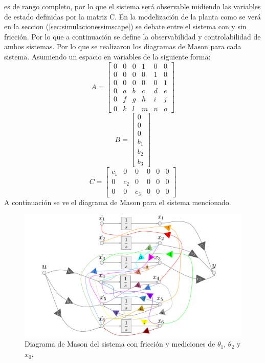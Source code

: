 es de rango completo, por lo que el sistema será observable midiendo las variables de estado definidas por la matriz C.
En la modelización de la planta como se verá en la seccion (\ref{sec:simulacionessimscape}) se debate entre el sistema con y sin fricción.
Por lo que a continuación se define la observabilidad y controlabilidad de ambos sistemas. Por lo que se realizaron los diagramas de Mason para cada sistema.
Asumiendo un espacio en variables de la siguiente forma:
\begin{equation}
 A = \begin{bmatrix}
0 &  0 & 0 & 1 &  0 & 0\\
0 &  0 & 0 & 0 &  1 & 0\\
0 &  0 & 0 & 0 &  0 & 1\\
0 &  a & b & c &  d & e\\
0 &  f & g & h &  i & j\\
0 &  k & l & m &  n & o
\end{bmatrix}
\end{equation}
\begin{equation}
 B = \begin{bmatrix}
0 \\
0 \\
0 \\
b_1 \\
b_2 \\
b_3 
\end{bmatrix}
\end{equation}
\begin{equation}
C = 	\begin{bmatrix}
c_1 & 0 & 0 & 0 & 0 & 0\\
0 & c_2 & 0 & 0 & 0 & 0\\
0 & 0 & c_3 & 0 & 0 & 0
\end{bmatrix}
\end{equation}
A continuación se ve el diagrama de Mason para el sistema mencionado.
\begin{figure}[H]
	\centering
	\includegraphics[width=1\linewidth,page = 1]{../Modelo Teorico/ImagenesModelo Teorico/Mason.pdf}
	\caption{Diagrama de Mason del sistema con fricción y mediciones de $\theta_1$, $\theta_2$ y $x_0$.}	
	\label{fig:masonsisfyxomf}
\end{figure}

